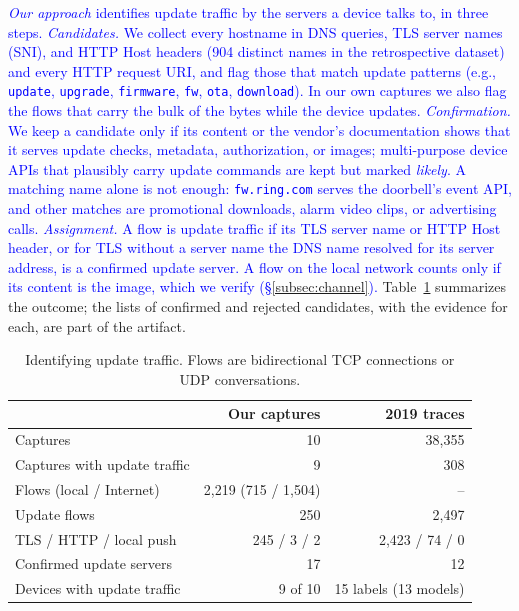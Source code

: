 \textcolor{blue}{\emph{Our approach} identifies update traffic by the servers a device talks to, in three steps.
\emph{Candidates.} We collect every hostname in DNS queries, TLS server names (SNI), and HTTP Host headers (904 distinct names in the retrospective dataset) and every HTTP request URI, and flag those that match update patterns (e.g., \texttt{update}, \texttt{upgrade}, \texttt{firmware}, \texttt{fw}, \texttt{ota}, \texttt{download}).
In our own captures we also flag the flows that carry the bulk of the bytes while the device updates.
\emph{Confirmation.} We keep a candidate only if its content or the vendor's documentation shows that it serves update checks, metadata, authorization, or images; multi-purpose device APIs that plausibly carry update commands are kept but marked \emph{likely}.
A matching name alone is not enough: \texttt{fw.ring.com} serves the doorbell's event API, and other matches are promotional downloads, alarm video clips, or advertising calls.
\emph{Assignment.} A flow is update traffic if its TLS server name or HTTP Host header, or for TLS without a server name the DNS name resolved for its server address, is a confirmed update server.
A flow on the local network counts only if its content is the image, which we verify (\S\ref{subsec:channel}).
}
Table~\ref{tab:funnel} summarizes the outcome; the lists of confirmed and rejected candidates, with the evidence for each, are part of the artifact.

\begin{table}[!t]
    \centering
    \caption{Identifying update traffic. Flows are bidirectional TCP connections or UDP conversations.}
    \label{tab:funnel}
    \setlength{\tabcolsep}{4pt}
    \small
    \begin{tabular}{@{} l r r @{}}
        \toprule
         & \textbf{Our captures} & \textbf{2019 traces} \\
        \midrule
        Captures                              & 10                  & 38,355 \\
        Captures with update traffic          & 9                   & 308 \\
        Flows (local / Internet)              & 2,219 (715 / 1,504) & -- \\
        Update flows                          & 250                 & 2,497 \\
        \quad TLS / HTTP / local push         & 245 / 3 / 2         & 2,423 / 74 / 0 \\
        Confirmed update servers              & 17                  & 12 \\
        Devices with update traffic           & 9 of 10             & 15 labels (13 models) \\
        \bottomrule
    \end{tabular}
\end{table}

